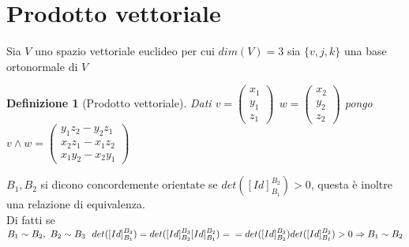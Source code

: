 \documentclass[12px]{article}
\theoremstyle{break}
\theoremstyle{break}
\theoremstyle{break}
\newtheorem{defin}{Definizione}
\theoremstyle{break}
\theoremstyle{break}
\theoremstyle{break}
\newenvironment{defi}
{\begin{mdframed}[linecolor=orange, backgroundcolor=orange!10]\begin{defin}}
  {\end{defin}\end{mdframed}}
\newcommand{\icol}[1]{%
  \left(\begin{smallmatrix}#1\end{smallmatrix}\right)%
}
\begin{document}
	\section{Prodotto vettoriale}
		Sia $V$ uno spazio vettoriale euclideo per cui $dim(V) = 3$ sia $\{v,j,k\}$ una base ortonormale di $V$
		\begin{defi}[Prodotto vettoriale]
			Dati $v = \icol{x_1\\y_1\\z_1}\ \ w=\icol{x_2\\y_2\\z_2}$ pongo $v\wedge w = \icol{y_1z_2 - y_2z_1\\x_2z_1-x_1z_2\\x_1y_2-x_2y_1}$
		\end{defi}
		\begin{nota}
			$B_1,B_2$ si dicono concordemente orientate se $det([Id]^{B_2}_{B_1})>0$, questa è inoltre una relazione di equivalenza.\\
			Di fatti se $B_1\sim B_2, \ B_2\sim B_3\ \ det([Id]^{B_3}_{B_1})= det([Id]^{B_3}_{B_2}[Id]^{B_2}_{B_1})=\\ =det([Id]^{B_3}_{B_2})det([Id]^{B_2}_{B_1})>0 \Rightarrow B_1\sim B_2$
		\end{nota}
\end{document}
